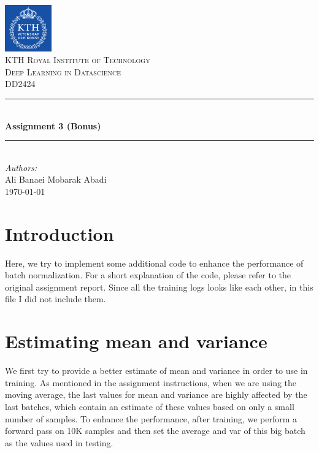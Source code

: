 \documentclass[a4paper]{article}
\begin{document}
\begin{titlepage}

\newcommand{\HRule}{\rule{\linewidth}{0.5mm}} 							%
\center 
 
 

\includegraphics[width=0.15\textwidth]{images/kth_logo.png}\\[0.5cm] 	%

\textsc{\LARGE KTH Royal Institute of Technology}\\[1cm]

\textsc{\Large Deep Learning in Datascience}\\[0.2cm]
\textsc{\large DD2424}\\[1cm] 										%
\HRule \\[0.8cm]
{ \huge \bfseries Assignment 3 (Bonus)}\\[0.7cm]								%
\HRule \\[2cm]
\large
\emph{Authors:}\\
Ali Banaei Mobarak Abadi\\[1.5cm]													%
{\large \today}\\[5cm]

\vfill 
\end{titlepage}

\section{Introduction}

Here, we try to implement some additional code to enhance the performance of batch normalization. For a short explanation of the code, please refer to the original assignment report. Since all the training logs looks like each other, in this file I did not include them.

\section{Estimating mean and variance}

We first try to provide a better estimate of mean and variance in order to use in training. As mentioned in the assignment instructions, when we are using the moving average, the last values for mean and variance are highly affected by the last batches, which contain an estimate of these values based on only a small number of samples. To enhance the performance, after training, we perform a forward pass on 10K samples and then set the average and var of this big batch as the values used in testing.
\end{document}
